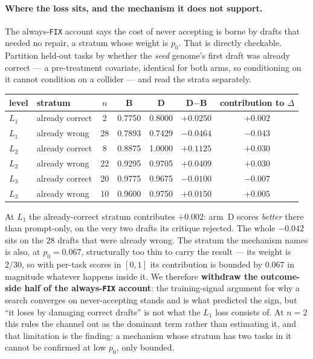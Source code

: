 \documentclass[11pt]{article}
\newcommand{\dd}{\ensuremath{\Delta}}
\begin{document}
\paragraph{Where the loss sits, and the mechanism it does not support.} The always-\texttt{FIX}
account says the cost of never accepting is borne by drafts that needed no repair, a stratum
whose weight is $p_0$. That is directly checkable. Partition held-out tasks by whether the
\emph{seed} genome's first draft was already correct --- a pre-treatment covariate, identical
for both arms, so conditioning on it cannot condition on a collider --- and read the strata
separately.

\begin{center}\small
\begin{tabular}{llccccc}
\toprule
level & stratum & $n$ & B & D & D$-$B & contribution to $\dd$ \\
\midrule
$L_1$ & already correct & 2  & 0.7750 & 0.8000 & $+0.0250$ & $\mathbf{+0.002}$ \\
$L_1$ & already wrong   & 28 & 0.7893 & 0.7429 & $-0.0464$ & $\mathbf{-0.043}$ \\
$L_2$ & already correct & 8  & 0.8875 & 1.0000 & $+0.1125$ & $+0.030$ \\
$L_2$ & already wrong   & 22 & 0.9295 & 0.9705 & $+0.0409$ & $+0.030$ \\
$L_3$ & already correct & 20 & 0.9775 & 0.9675 & $-0.0100$ & $-0.007$ \\
$L_3$ & already wrong   & 10 & 0.9600 & 0.9750 & $+0.0150$ & $+0.005$ \\
\bottomrule
\end{tabular}
\end{center}

At $L_1$ the already-correct stratum contributes $+0.002$: arm~D scores \emph{better} there
than prompt-only, on the very two drafts its critique rejected. The whole $-0.042$ sits on the
$28$ drafts that were already wrong. The stratum the mechanism names is also, at $p_0 = 0.067$,
structurally too thin to carry the result --- its weight is $2/30$, so with per-task scores in
$[0,1]$ its contribution is bounded by $0.067$ in magnitude whatever happens inside it. We
therefore \textbf{withdraw the outcome-side half of the always-\texttt{FIX} account}: the
training-signal argument for why a search converges on never-accepting stands and is what
predicted the sign, but ``it loses by damaging correct drafts'' is not what the $L_1$ loss
consists of. At $n=2$ this rules the channel out as the dominant term rather than estimating
it, and that limitation is the finding: a mechanism whose stratum has two tasks in it cannot be
confirmed at low $p_0$, only bounded.
\end{document}

